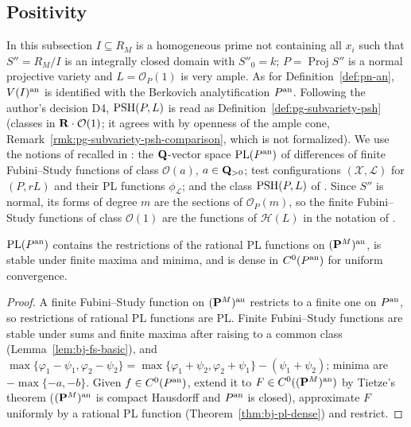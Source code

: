 \subsection{Positivity}\label{subsec:wu-positivity}

\begin{convention}\label{conv:wu-bj-global}
\notready
{}
In this subsection $I\subseteq R_M$ is a homogeneous prime not containing all $x_i$ such that $S''=R_M/I$ is an
integrally closed domain with $S''_0=k$; $P=\operatorname{Proj}S''$ is a normal projective variety and
$L=\mathcal O_P(1)$ is very ample. As for Definition~\ref{def:pn-an}, $V(I)^{\mathrm{an}}$ is identified with the Berkovich
analytification $P^{\mathrm{an}}$. Following the author's decision D4, $\operatorname{PSH}(P,L)$ is read as Definition~\ref{def:pg-subvariety-psh}
(classes in $\mathbf{R}\cdot\mathcal O(1)$; it agrees with \cite[Definition~4.1]{BJ22} by openness of the ample cone,
Remark~\ref{rmk:pg-subvariety-psh-comparison}, which is not formalized). We use the notions of \cite{BJ22} recalled in \cite[\S2]{FHX}: the $\mathbf{Q}$-vector space
$\operatorname{PL}(P^{\mathrm{an}})$ of differences of finite Fubini--Study functions of class $\mathcal O(a)$, $a\in\mathbf{Q}_{>0}$;
test configurations $(\mathcal X,\mathcal L)$ for $(P,rL)$ and their PL functions $\phi_{\mathcal L}$; and the class
$\operatorname{PSH}(P,L)$ of \cite[Definition~4.1]{BJ22}. Since $S''$ is normal, its forms of degree $m$ are the sections of
$\mathcal O_P(m)$, so the finite Fubini--Study functions of class $\mathcal O(1)$ are the functions of
$\mathcal H(L)$ in the notation of \cite{BJ22}.
\end{convention}

\begin{lemma}\label{lem:wu-pl-dense}
\notready
{}
$\operatorname{PL}(P^{\mathrm{an}})$ contains the restrictions of the rational PL functions on $(\mathbf{P}^M)^{\mathrm{an}}$, is stable under
finite maxima and minima, and is dense in $C^0(P^{\mathrm{an}})$ for uniform convergence.
\end{lemma}

\begin{proof}
A finite Fubini--Study function on $(\mathbf{P}^M)^{\mathrm{an}}$ restricts to a finite one on $P^{\mathrm{an}}$, so restrictions of rational
PL functions are PL. Finite Fubini--Study functions are stable under sums and finite maxima after raising to a common
class (Lemma~\ref{lem:bj-fs-basic}), and
$\max\{\varphi_1-\psi_1,\varphi_2-\psi_2\}=\max\{\varphi_1+\psi_2,\varphi_2+\psi_1\}-(\psi_1+\psi_2)$; minima are
$-\max\{-a,-b\}$. Given $f\in C^0(P^{\mathrm{an}})$, extend it to $F\in C^0((\mathbf{P}^M)^{\mathrm{an}})$ by Tietze's theorem
($(\mathbf{P}^M)^{\mathrm{an}}$ is compact Hausdorff and $P^{\mathrm{an}}$ is closed), approximate $F$ uniformly by a rational PL function
(Theorem~\ref{thm:bj-pl-dense}) and restrict.
\end{proof}

